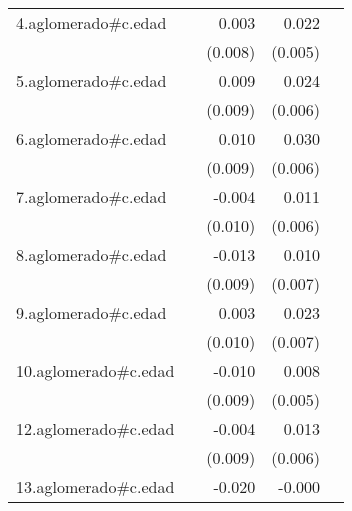 {\begin{longtable}{l*{4}{D{.}{.}{-1}}}
\addlinespace
4.aglomerado#c.edad&                     &       0.003         &       0.022\sym{***}&                     \\
            &                     &     (0.008)         &     (0.005)         &                     \\
\addlinespace
5.aglomerado#c.edad&                     &       0.009         &       0.024\sym{***}&                     \\
            &                     &     (0.009)         &     (0.006)         &                     \\
\addlinespace
6.aglomerado#c.edad&                     &       0.010         &       0.030\sym{***}&                     \\
            &                     &     (0.009)         &     (0.006)         &                     \\
\addlinespace
7.aglomerado#c.edad&                     &      -0.004         &       0.011         &                     \\
            &                     &     (0.010)         &     (0.006)         &                     \\
\addlinespace
8.aglomerado#c.edad&                     &      -0.013         &       0.010         &                     \\
            &                     &     (0.009)         &     (0.007)         &                     \\
\addlinespace
9.aglomerado#c.edad&                     &       0.003         &       0.023\sym{**} &                     \\
            &                     &     (0.010)         &     (0.007)         &                     \\
\addlinespace
10.aglomerado#c.edad&                     &      -0.010         &       0.008         &                     \\
            &                     &     (0.009)         &     (0.005)         &                     \\
\addlinespace
12.aglomerado#c.edad&                     &      -0.004         &       0.013\sym{*}  &                     \\
            &                     &     (0.009)         &     (0.006)         &                     \\
\addlinespace
13.aglomerado#c.edad&                     &      -0.020\sym{*}  &      -0.000         &                     \\

\end{longtable}}
